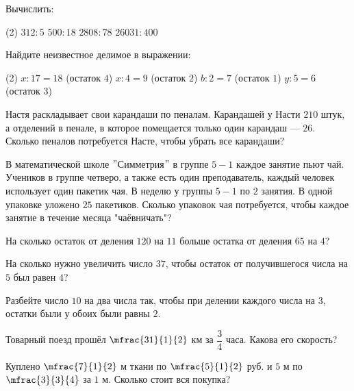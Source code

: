 \begin{consultation}
	\begin{listofex}
	\item Вычислить:
		\begin{tasks}(2)
			\task \( 312:5 \)
			\task \( 500:18 \)
			\task \( 2808:78 \)
			\task \( 26031:400 \)
		\end{tasks}	
	\item Найдите неизвестное делимое в выражении:
	\begin{tasks}(2)
		\task \( x:17=18 \) (остаток \( 4 \))
		\task \( x:4=9 \) (остаток \( 2 \))
		\task \( b:2=7 \) (остаток \( 1 \))
		\task \( y:5=6 \) (остаток \( 3 \))
	\end{tasks}	
	\item Настя раскладывает свои карандаши по пеналам. Карандашей у Насти \( 210 \) штук, а отделений в пенале, в которое помещается только один карандаш --- \( 26 \). Сколько пеналов потребуется Насте, чтобы убрать все карандаши?
	\item В математической школе \( " \)Симметрия\( " \) в группе \( 5-1 \) каждое занятие пьют чай. Учеников в группе четверо, а также есть один преподаватель, каждый человек использует один пакетик чая. В неделю у группы \( 5-1 \) по \( 2 \) занятия. В одной упаковке уложено \( 25 \) пакетиков. Сколько упаковок чая потребуется, чтобы каждое занятие в течение месяца "чаёвничать"?
	\item На сколько остаток от деления \( 120 \) на \( 11 \) больше остатка от деления \( 65 \) на \( 4 \)?
	\item На сколько нужно увеличить число \( 37 \), чтобы остаток от получившегося числа на \( 5 \) был равен \( 4 \)?
	\item Разбейте число \( 10 \) на два числа так, чтобы при делении каждого числа на \( 3 \), остатки были у обоих были равны \( 2 \).
	\item Товарный поезд прошёл \( \mfrac{31}{1}{2} \) км за \( \dfrac{3}{4} \) часа. Какова его скорость?
	\item Куплено \( \mfrac{7}{1}{2} \) м ткани по \( \mfrac{5}{1}{2} \) руб. и \( 5 \) м по \( \mfrac{3}{3}{4} \) за \( 1 \) м. Сколько стоит вся покупка?
\end{listofex}
\end{consultation}
